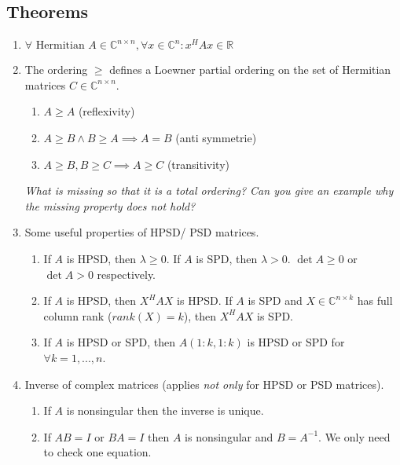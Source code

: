 \documentclass[a4paper, landscape,twocolumn,fontsize=9pt]{scrartcl}
\begin{document}
\subsection*{Theorems}
\begin{enumerate}
    \item $\forall \text{ Hermitian } A \in  \mathbb C^{n \times n}, \forall x \in  \mathbb C^n: x^HAx \in \mathbb R$
    
    \item The ordering $\geq$ defines a Loewner partial ordering on the set of Hermitian matrices $C \in \mathbb C^{n \times n}$. 
    \begin{enumerate}
        \item $A \geq A$ (reflexivity)
        \item $A \geq B \land B \geq A \implies A = B$ (anti symmetrie)
        \item $A \geq B, B \geq C \implies A \geq C$ (transitivity)
    \end{enumerate}
    \textit{What is missing so that it is a total ordering? Can you give an example why the missing property does not hold?}
    
    \item Some useful properties of HPSD/ PSD matrices.
    \begin{enumerate}
        \item If $A$ is HPSD, then $\lambda \geq 0$. If $A$ is SPD, then $\lambda > 0$. $\det A \geq 0$ or $\det A > 0$ respectively.
        \item If $A$ is HPSD, then $X^HAX$ is HPSD. If $A$ is SPD and $X \in \mathbb C^{n \times k}$ has full column rank ($rank(X) = k$), then $X^HAX$ is SPD.
        \item If $A$ is HPSD or SPD, then $A(1:k, 1:k)$ is HPSD or SPD for $\forall k = 1,...,n$.
    \end{enumerate}
    
    \item Inverse of complex matrices (applies \emph{not only} for HPSD or PSD matrices).
    \begin{enumerate}
        \item If $A$ is nonsingular then the inverse is unique.
        
        \item If $AB = I$ or $BA = I$ then $A$ is nonsingular and $B = A^{-1}$. We only need to check one equation.
    \end{enumerate}
\end{enumerate}
\end{document}
